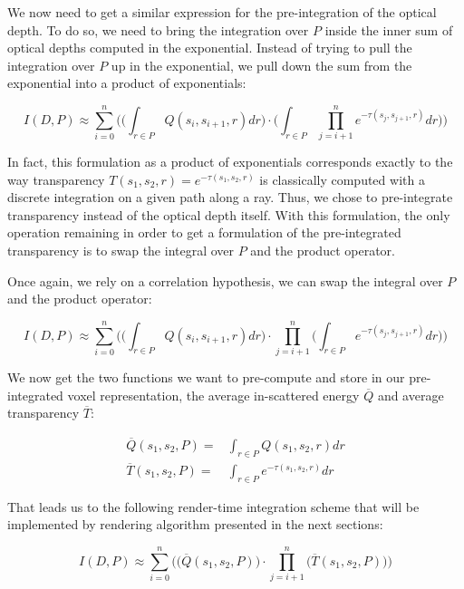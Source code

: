 We now need to get a similar expression for the pre-integration of the optical depth. To do so, we need to bring the integration over $P$ inside the inner sum of optical depths computed in the exponential. Instead of trying to pull the integration over $P$ up in the exponential, we pull down the sum from the exponential into a product of exponentials:

\begin{equation*}
	I(D,P)\approx \sum^{n}_{i=0}\Bigg(\Bigg( \int_{r\in P}Q(s_i,s_{i+1},r)dr\Bigg)\cdot\Bigg( \int_{r\in P}\prod^{n}_{j=i+1} e^{-\tau(s_j,s_{j+1},r)}dr\Bigg)\Bigg)
\end{equation*}

In fact, this formulation as a product of exponentials corresponds exactly to the way transparency $T(s_1,s_2,r)=e^{-\tau(s_1,s_2,r)}$ is classically computed with a discrete integration on a given path along a ray. Thus, we chose to pre-integrate transparency instead of the optical depth itself. With this formulation, the only operation remaining in order to get a formulation of the pre-integrated transparency is to swap the integral over $P$ and the product operator.

Once again, we rely on a correlation hypothesis, we can swap the integral over $P$ and the product operator:

\begin{equation*}
	I(D,P)\approx \sum^{n}_{i=0}\Bigg(\Bigg( \int_{r\in P}Q(s_i,s_{i+1},r)dr\Bigg)\cdot\prod^{n}_{j=i+1}\Bigg( \int_{r\in P} e^{-\tau(s_j,s_{j+1},r)}dr\Bigg)\Bigg)
\end{equation*}

We now get the two functions we want to pre-compute and store in our pre-integrated voxel representation, the average in-scattered energy $\overline{Q}$ and average transparency $\overline{T}$: 

\begin{equation*}
	\begin{aligned}
		\overline{Q}(s_1,s_2,P)=&\int_{r\in P}Q(s_1,s_2,r)dr\\
		\overline{T}(s_1,s_2,P)=&\int_{r\in P}e^{-\tau(s_1,s_2,r)}dr
	\end{aligned}
\end{equation*}

That leads us to the following render-time integration scheme that will be implemented by rendering algorithm presented in the next sections:

\begin{equation}\label{eq:vct-2}
	I(D,P)\approx \sum^{n}_{i=0}\Bigg(\bigg( \overline{Q}(s_1,s_2,P)\bigg)\cdot\prod^{n}_{j=i+1}\bigg( \overline{T}(s_1,s_2,P)\bigg)\Bigg)
\end{equation}




